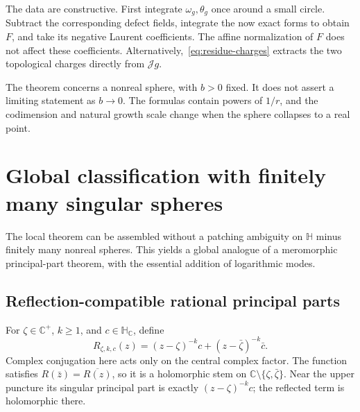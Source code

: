 \documentclass[11pt,a4paper]{article}
\numberwithin{equation}{section}
\theoremstyle{definition}
\theoremstyle{remark}
\newcommand{\C}{\mathbb C}
\newcommand{\HH}{\mathbb H}
\newcommand{\HC}{\mathbb H_{\C}}
\newcommand{\J}{\mathcal J}
\begin{document}
The data are constructive. First integrate $\omega_g,\theta_g$ once
around a small circle. Subtract the corresponding defect fields,
integrate the now exact forms to obtain $F$, and take its negative
Laurent coefficients. The affine normalization of $F$ does not affect
these coefficients. Alternatively,~\eqref{eq:residue-charges} extracts
the two topological charges directly from $\J g$.

The theorem concerns a nonreal sphere, with $b>0$ fixed. It does not
assert a limiting statement as $b\to0$. The formulas contain powers of
$1/r$, and the codimension and natural growth scale change when the
sphere collapses to a real point.

\section{Global classification with finitely many singular spheres}
\label{sec:global-singular}

The local theorem can be assembled without a patching ambiguity on
$\HH$ minus finitely many nonreal spheres. This yields a global
analogue of a meromorphic principal-part theorem, with the essential
addition of logarithmic modes.

\subsection{Reflection-compatible rational principal parts}
For $\zeta\in\C^+$, $k\ge1$, and $c\in\HC$, define
\begin{equation}
 R_{\zeta,k,c}(z)=(z-\zeta)^{-k}c+(z-\bar\zeta)^{-k}\bar c.
 \label{eq:paired-rational}
\end{equation}
Complex conjugation here acts only on the central complex factor.
The function satisfies $R(\bar z)=\overline{R(z)}$, so it is a
holomorphic stem on $\C\setminus\{\zeta,\bar\zeta\}$.
Near the upper puncture its singular principal part is exactly
$(z-\zeta)^{-k}c$; the reflected term is holomorphic there.
\end{document}
